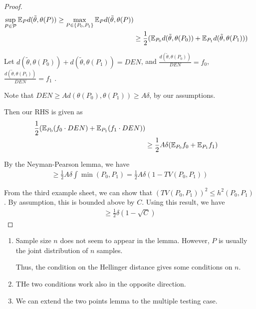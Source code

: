 \begin{proof}
  \begin{align}
    \label{eq:111}
    \sup_{P \in \mathcal{P}} \E_{P} d(\tilde \theta, \theta(P)) \geq
    \max_{P \in \{ P_{0}, P_{1} \}} \E_{P} d(\tilde \theta, \theta(P))
    \\
    &\geq \frac{1}{2} (\E_{P_{0}} d(\tilde \theta, \theta(P_{0})) +
    \E_{P_{1}} d(\tilde \theta, \theta(P_{1}))) \\
  \end{align}

Let $d(\tilde \theta, \theta(P_{0})) + d(\tilde \theta, \theta(P_{1}))
= DEN$, and $\frac{d(\tilde \theta, \theta(P_{0}))}{DEN} = f_{0}$,
$\frac{d(\tilde \theta, \theta(P_{1}))}{DEN} = f_{1}$ .

Note that $DEN \geq Ad(\theta(P_{0}), \theta(P_{1})) \geq A \delta$,
by our assumptions.

Then our RHS is given as
\begin{align}
  \label{eq:112}
  \frac{1}{2} (\E_{P_{0}}(f_{0} \cdot DEN) + \E_{P_{1}} (f_{1} \cdot
  DEN)) \\
  &\geq \frac{1}{2} A \delta (\E_{P_{0}} f_{0} + \E_{P_{1}} f_{1})
\end{align}

By the Neyman-Pearson lemma, we have
\begin{align}
  \label{eq:113}
  \geq \frac{1}{2} A \delta \int \min(P_{0}, P_{1}) = \frac{1}{2} A
  \delta (1 - TV(P_{0}, P_{1}))
\end{align}

From the third example sheet, we can show that $(TV(P_{0}, P_{1}))^{2}
\leq h^{2}(P_{0}, P_{1})$.  By assumption, this is bounded above by
$C$.  Using this result, we have
\begin{align}
  \label{eq:114}
  \geq \frac{1}{2} \delta (1 - \sqrt{C})
\end{align}

\end{proof}

\begin{remark}
  \begin{enumerate}
  \item Sample size $n$ does not seem to appear in the lemma.
    However, $P$ is usually the joint distribution of $n$ samples.

    Thus, the condition on the Hellinger distance gives some
    conditions on $n$.
  \item THe two conditions work also in the opposite direction.
  \item We can extend the two points lemma to the multiple testing case.
  \end{enumerate}
\end{remark}

